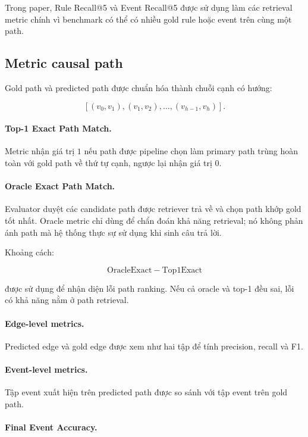 Trong paper, Rule Recall@5 và Event Recall@5 được sử dụng làm các retrieval
metric chính vì benchmark có thể có nhiều gold rule hoặc event trên cùng một
path.

\subsection{Metric causal path}

Gold path và predicted path được chuẩn hóa thành chuỗi cạnh có hướng:

\[
\left[
(v_0,v_1),
(v_1,v_2),
\ldots,
(v_{h-1},v_h)
\right].
\]

\paragraph{Top-1 Exact Path Match.}

Metric nhận giá trị \(1\) nếu path được pipeline chọn làm primary path trùng
hoàn toàn với gold path về thứ tự cạnh, ngược lại nhận giá trị \(0\).

\paragraph{Oracle Exact Path Match.}

Evaluator duyệt các candidate path được retriever trả về và chọn path khớp
gold tốt nhất. Oracle metric chỉ dùng để chẩn đoán khả năng retrieval; nó
không phản ánh path mà hệ thống thực sự sử dụng khi sinh câu trả lời.

Khoảng cách:

\[
\mathrm{OracleExact}
-
\mathrm{Top1Exact}
\]

được sử dụng để nhận diện lỗi path ranking. Nếu cả oracle và top-1 đều sai,
lỗi có khả năng nằm ở path retrieval.

\paragraph{Edge-level metrics.}

Predicted edge và gold edge được xem như hai tập để tính precision, recall
và F1.

\paragraph{Event-level metrics.}

Tập event xuất hiện trên predicted path được so sánh với tập event trên gold
path.

\paragraph{Final Event Accuracy.}

